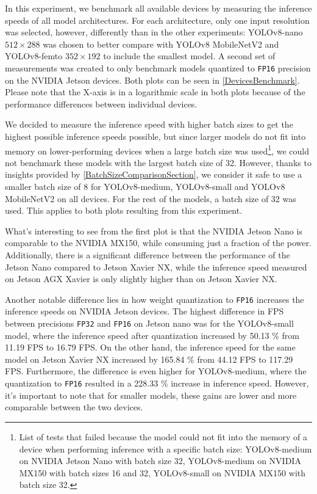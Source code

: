 In this experiment, we benchmark all available devices by measuring the
inference speeds of all model architectures. For each architecture, only one
input resolution was selected, however, differently than in the other
experiments: YOLOv8-nano $512 \times 288$ was chosen to better compare with
YOLOv8 MobileNetV2 and YOLOv8-femto $352 \times 192$ to include the smallest
model. A second set of measurements was created to only benchmark models
quantized to \texttt{FP16} precision on the NVIDIA Jetson devices. Both plots
can be seen in \autoref{DevicesBenchmark}. Please note that the X-axis is in a
logarithmic scale in both plots because of the performance differences between
individual devices.

We decided to measure the inference speed with higher batch sizes to get the
highest possible inference speeds possible, but since larger models do not fit
into memory on lower-performing devices when a large batch size was
used\footnote{List of tests that failed because the model could not fit into
the memory of a device when performing inference with a specific batch size:
YOLOv8-medium on NVIDIA Jetson Nano with batch size 32, YOLOv8-medium on NVIDIA
MX150 with batch sizes 16 and 32, YOLOv8-small on NVIDIA MX150 with batch size
32.}, we could not benchmark these models with the largest batch size of 32.
However, thanks to insights provided by \autoref{BatchSizeComparisonSection}, we
consider it safe to use a smaller batch size of 8 for YOLOv8-medium,
YOLOv8-small and YOLOv8 MobileNetV2 on all devices. For the rest of the models,
a batch size of 32 was used. This applies to both plots resulting from this
experiment.

What's interesting to see from the first plot is that the NVIDIA Jetson Nano is
comparable to the NVIDIA MX150, while consuming just a fraction of the power.
Additionally, there is a significant difference between the performance of the
Jetson Nano compared to Jetson Xavier NX, while the inference speed measured on
Jetson AGX Xavier is only slightly higher than on Jetson Xavier NX.

Another notable difference lies in how weight quantization to \texttt{FP16}
increases the inference speeds on NVIDIA Jetson devices. The highest difference
in FPS between precisions \texttt{FP32} and \texttt{FP16} on Jetson nano was for
the YOLOv8-small model, where the inference speed after quantization increased
by \num{50.13} \% from \num{11.19} FPS to \num{16.79} FPS. On the other hand,
the inference speed for the same model on Jetson Xavier NX increased by
\num{165.84} \% from \num{44.12} FPS to \num{117.29} FPS. Furthermore, the
difference is even higher for YOLOv8-medium, where the quantization to
\texttt{FP16} resulted in a \num{228.33} \% increase in inference speed.
However, it's important to note that for smaller models, these gains are lower
and more comparable between the two devices.

